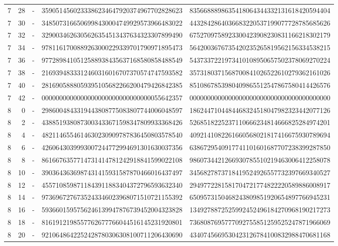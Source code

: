 \begin{longtable}{rrrll}
7 & 28 & - & 3590514560233386234647920374967702828623 & 8356688898635418064344332131618420594404 \\
7 & 30 & - & 3485073166506998430004749929573966483022 & 4432842864036683220537199077728785685626 \\
7 & 32 & - & 3290034626305626354513437634323307899490 & 6752709758923300423908230831166218302179 \\
7 & 34 & - & 9781161700889263000229339701790971895473 & 5642003676735420235265819562156334538215 \\
7 & 36 & - & 9772898410512588938435637168580858488549 & 5437337221973410108950657502378069270224 \\
7 & 38 & - & 2169394833312460316016707370574747593582 & 3573180371568700841026522610279362161026 \\
7 & 40 & - & 2816905888059395105682266200479426842385 & 8510867853980409865512547867580414426576 \\
7 & 42 & - & 0000000000000000000000000000000055642357 & 0000000000000000000000000000000000000000 \\
8 & 0 & - & 2986004843319443808775083807744006048597 & 1862447104484468324518047982323442077126 \\
8 & 2 & - & 4388519380873003433671598347809933368426 & 5268518225237110666234814666825284974201 \\
8 & 4 & - & 4821146554614630230909787836450803578540 & 4092141082261660568021817416675930789694 \\
8 & 6 & - & 4260643039993007244772994691301630037356 & 6386729540917741101601687707238399287850 \\
8 & 8 & - & 8616676357714731414781242918841599022108 & 9860734421266930785510219463006412258078 \\
8 & 10 & - & 3903643636987431415931587870466016437497 & 3456827873718419524926557732397669340527 \\
8 & 12 & - & 4557108598711843911883404372796593632340 & 2949772281581704721774822220589886008917 \\
8 & 14 & - & 9736967276735243346023968071510721155392 & 6509573150468243809851920654897766945231 \\
8 & 16 & - & 5936601595756246139947876739452004323828 & 1349278872525992452496184270968190217273 \\
8 & 18 & - & 8161912198557762677766044516145231920801 & 7368087695777092755851259525247871966069 \\
8 & 20 & - & 9210648642252428780306308100711206430690 & 4340745669530423126784100832988470681168 \\

\end{longtable}
